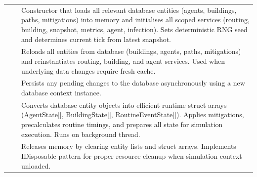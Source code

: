 \begin{longtable}{|L{4cm}|L{4cm}|L{6cm}|}
 & 
 & 
Constructor that loads all relevant database entities (agents, buildings, paths, mitigations) into memory and initialises all scoped services (routing, building, snapshot, metrics, agent, infection). Sets deterministic RNG seed and determines current tick from latest snapshot. \\
&  & 
Reloads all entities from database (buildings, agents, paths, mitigations) and reinstantiates routing, building, and agent services. Used when underlying data changes require fresh cache. \\
&  & 
Persists any pending changes to the database asynchronously using a new database context instance. \\
&  & 
Converts database entity objects into efficient runtime struct arrays (AgentState[], BuildingState[], RoutineEventState[]). Applies mitigations, precalculates routine timings, and prepares all state for simulation execution. Runs on background thread. \\
&  & 
Releases memory by clearing entity lists and struct arrays. Implements IDisposable pattern for proper resource cleanup when simulation context unloaded. \\
\hline


\end{longtable}
